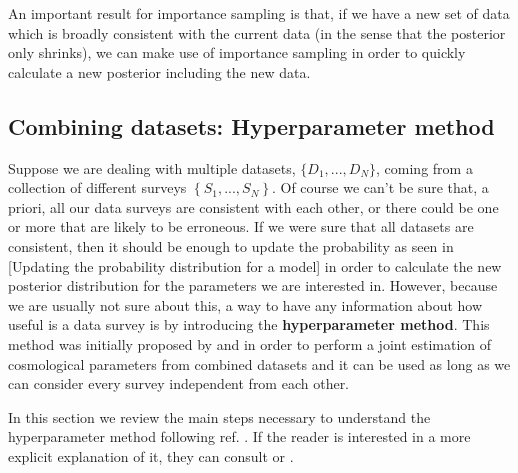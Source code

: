 \documentclass[onecolumn,           %
               showpacs,            %
               preprintnumbers,     %
               aps,                 %
               prl,          	    %
               letterpaper,             %
               superscriptaddress,      %
               nofootinbib,         %
               tightenlines,        %
               floats,floatfix      %
               ,usenatbib,
               ]{revtex4-1}
\begin{document}
An important result for importance sampling is that, if we have a new set of data which is broadly consistent with the current data (in the sense that the posterior only shrinks), we can make use of importance sampling in order to quickly calculate a new posterior including the new data.
\subsection{Combining datasets: Hyperparameter method}

Suppose we are dealing with multiple datasets,  $\lbrace D_1,...,D_N\rbrace$, coming from a collection of different surveys $\left\lbrace S_1,...,S_N\right\rbrace$. Of course we can't be sure that, a priori, all our data surveys are consistent with each other, or there could be one or more that are likely to be erroneous. If we were sure that all datasets are consistent, then it should be enough to update the probability as seen in [Updating the probability distribution for a model] in order to calculate the new posterior distribution for the parameters we are interested in. However, because we are usually not sure about this, a way to have any information about how useful is a data survey is by introducing the \textbf{hyperparameter method}. This method was initially proposed by \cite{hiperp} and \cite{hiperp1} in order to perform a joint estimation of cosmological parameters from combined datasets and it can be used as long as we can consider every survey independent from each other.

In this section we review the main steps necessary to understand the hyperparameter method following ref. \cite{hiperp1}. If the reader is interested in a more explicit explanation of it, they can consult \cite{hiperp} or \cite{hiperp1}.
\end{document}
